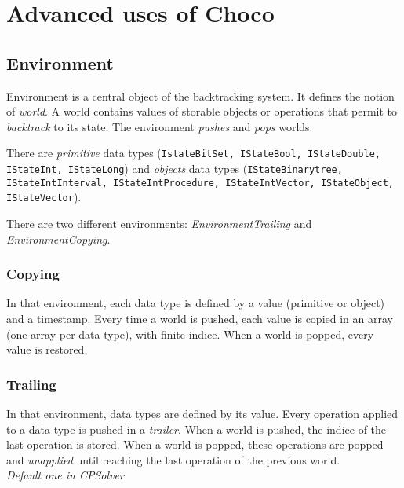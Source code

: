 \label{advanced}
\hypertarget{advanced}{}


\chapter{Advanced uses of Choco}\label{advanced:advancedusesofchoco}\hypertarget{advanced:advancedusesofchoco}{}

\section{Environment}\label{advanced:environment}\hypertarget{advanced:environment}{}

Environment is a central object of the backtracking system. It defines the notion of \textit{world}. A world contains values of storable objects or operations that permit to \textit{backtrack} to its state. The environment \textit{pushes} and \textit{pops} worlds.

There are \textit{primitive} data types (\texttt{IstateBitSet, IStateBool, IStateDouble, IStateInt, IStateLong}) and \textit{objects} data types (\texttt{IStateBinarytree, IStateIntInterval, IStateIntProcedure, IStateIntVector, IStateObject, IStateVector}).

There are two different environments: \textit{EnvironmentTrailing} and \textit{EnvironmentCopying}.

\subsection{Copying}\label{advanced:copying}\hypertarget{advanced:copying}{}
In that environment, each data type is defined by a value (primitive or object) and a timestamp. Every time a world is pushed, each value is copied in an array (one array per data type), with finite indice. When a world is popped, every value is restored. 

\subsection{Trailing}\label{advanced:trailing}\hypertarget{advanced:trailing}{}
In that environment, data types are defined by its value. Every operation applied to a data type is pushed in a \textit{trailer}. When a world is pushed, the indice of the last operation is stored. When a world is popped, these operations are popped and \textit{unapplied} until reaching the last operation of the previous world.\\\textit{Default one in CPSolver}


